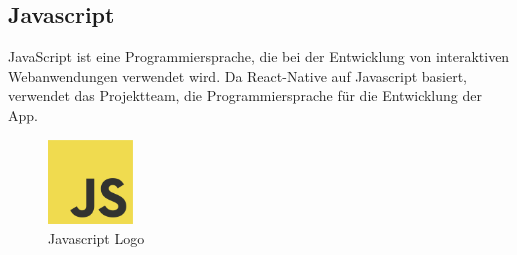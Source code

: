 \subsection{Javascript}
\noindent JavaScript ist eine Programmiersprache, die bei der Entwicklung von interaktiven Webanwendungen verwendet wird. Da React-Native auf Javascript basiert, verwendet das Projektteam, die Programmiersprache für die Entwicklung der App. 
\begin{figure}[H]
    \centering
    \includegraphics[width=0.2\textwidth]{images/jslogo.png}
    \caption{Javascript Logo }
    \label{fig:jslogo}
\end{figure}